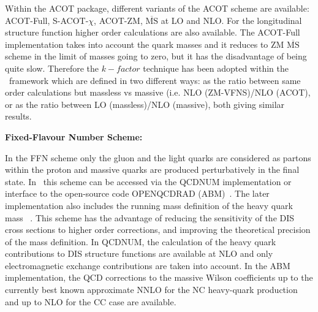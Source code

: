 \begin{description}
Within the ACOT package, different variants of the ACOT scheme are available:
ACOT-Full, S-ACOT-$\chi$, ACOT-ZM, $\overline{\text{MS}}$ at LO and NLO. 
For the longitudinal structure function higher order calculations are also available. 
The ACOT-Full implementation takes into account the quark masses 
and it reduces to ZM $\overline{\text{MS}}$ scheme in the limit of masses going to zero, 
but it has the disadvantage of being quite slow.
Therefore the $k-factor$ technique has been adopted within the \fitter\ framework which are  
defined in two different ways:
as the ratio between same order calculations but massless vs massive 
(i.e. NLO (ZM-VFNS)/NLO (ACOT), or as the ratio between LO (massless)/NLO (massive),
both giving similar results.
%
%
%
\vspace{0.1cm}
\item \bf {Fixed-Flavour Number Scheme:} \rm

In the FFN scheme only the gluon and the light quarks are considered
as partons within the proton and massive quarks are produced perturbatively in the final state.
In \fitter\ this scheme can be accessed via the 
QCDNUM implementation or interface to the open-source code OPENQCDRAD (ABM)~\cite{openqcdrad:page}.
The later implementation also includes the running mass definition of the heavy quark 
mass ~\cite{Alekhin:runm}.
This scheme has the advantage of reducing the sensitivity of the DIS cross sections to
higher order corrections, and improving the theoretical precision of the mass definition. 
In QCDNUM, the calculation of the heavy quark contributions to DIS structure functions
are available at NLO and only electromagnetic exchange contributions are taken into account.
In the ABM implementation, the QCD corrections to the massive Wilson coefficients 
up to the currently best known approximate NNLO for the NC heavy-quark 
production~\cite{SMoch:npb864} and up to NLO for the CC case are available.
\end{description}


